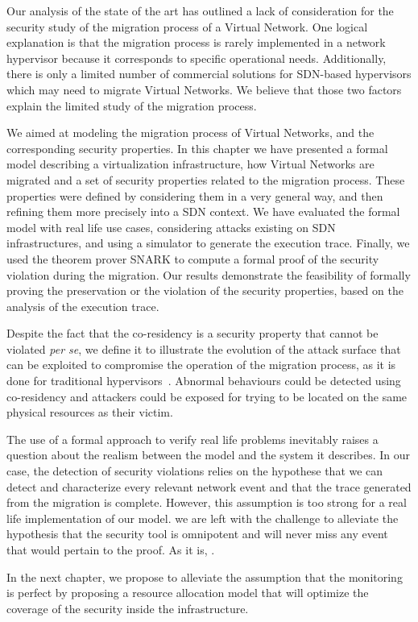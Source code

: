 Our analysis of the state of the art has outlined a lack of consideration for the security study of the migration process of a Virtual Network.
One logical explanation is that the migration process is rarely implemented in a network hypervisor because it corresponds to specific operational needs. Additionally, there is only a limited number of commercial solutions for SDN-based hypervisors which may need to migrate Virtual Networks. We believe that those two factors explain the limited study of the migration process.

We aimed at modeling the migration process of Virtual Networks, and the corresponding security properties.
In this chapter we have presented a formal model describing a virtualization infrastructure, how Virtual Networks are migrated  and a set of security properties related to the migration process. These properties were defined by considering them in a very general way, and then refining them more precisely into a SDN context. We have evaluated the formal model with real life use cases, considering attacks existing on SDN infrastructures, and using a simulator to generate the execution trace. Finally, we used the theorem prover SNARK to compute a formal proof of the security violation during the migration. Our results demonstrate the feasibility of formally proving the preservation or the violation of the security properties, based on the analysis of the execution trace.

Despite the fact that the co-residency is a security property that cannot be violated \textit{per se}, we define it to illustrate the evolution of the attack surface that can be exploited to compromise the operation of the migration process, as it is done for traditional hypervisors~\cite{stalling-atya2017,malicious-atya2017}.
Abnormal behaviours could be detected using co-residency and attackers could be exposed for trying to be located on the same physical resources as their victim. 

The use of a formal approach to verify real life problems inevitably raises a question about the realism between the model and the system it describes.
In our case, the detection of security violations relies on the hypothese that we can detect and characterize every relevant network event and that the trace generated from the migration is complete. However, this assumption is too strong for a real life implementation of our model. we are left with the challenge to alleviate the hypothesis that the security tool is omnipotent and will never miss any event that would pertain to the proof. As it is, .

In the next chapter, we propose to alleviate the assumption that the monitoring is perfect by proposing a resource allocation model that will optimize the coverage of the security inside the infrastructure.